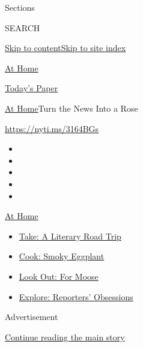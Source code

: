 Sections

SEARCH

\protect\hyperlink{site-content}{Skip to
content}\protect\hyperlink{site-index}{Skip to site index}

\href{https://www.nytimes.com/spotlight/at-home}{At Home}

\href{https://myaccount.nytimes.com/auth/login?response_type=cookie\&client_id=vi}{}

\href{https://www.nytimes.com/section/todayspaper}{Today's Paper}

\href{/spotlight/at-home}{At Home}\textbar{}Turn the News Into a Rose

\url{https://nyti.ms/3164BGs}

\begin{itemize}
\item
\item
\item
\item
\item
\end{itemize}

\href{https://www.nytimes.com/spotlight/at-home?action=click\&pgtype=Article\&state=default\&region=TOP_BANNER\&context=at_home_menu}{At
Home}

\begin{itemize}
\tightlist
\item
  \href{https://www.nytimes.com/2020/07/28/books/time-for-a-literary-road-trip.html?action=click\&pgtype=Article\&state=default\&region=TOP_BANNER\&context=at_home_menu}{Take:
  A Literary Road Trip}
\item
  \href{https://www.nytimes.com/2020/07/29/magazine/bored-with-your-home-cooking-some-smoky-eggplant-will-fix-that.html?action=click\&pgtype=Article\&state=default\&region=TOP_BANNER\&context=at_home_menu}{Cook:
  Smoky Eggplant}
\item
  \href{https://www.nytimes.com/2020/07/27/travel/moose-michigan-isle-royale.html?action=click\&pgtype=Article\&state=default\&region=TOP_BANNER\&context=at_home_menu}{Look
  Out: For Moose}
\item
  \href{https://www.nytimes.com/interactive/2020/at-home/even-more-reporters-editors-diaries-lists-recommendations.html?action=click\&pgtype=Article\&state=default\&region=TOP_BANNER\&context=at_home_menu}{Explore:
  Reporters' Obsessions}
\end{itemize}

Advertisement

\protect\hyperlink{after-top}{Continue reading the main story}

